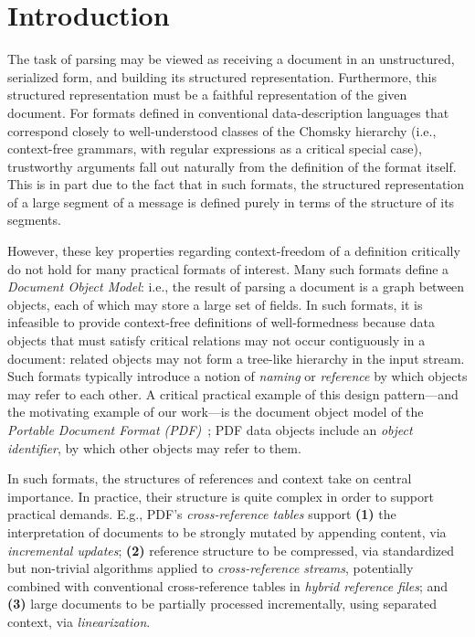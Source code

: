 \section{Introduction}
\label{sec:intro}
The task of parsing may be viewed as receiving a document in an
unstructured, serialized form, and building its structured
representation. Furthermore, this structured representation must be a
faithful representation of the given document.
%
For formats defined in conventional data-description languages that
correspond closely to well-understood classes of the Chomsky hierarchy
(i.e., context-free grammars, with regular expressions as a critical
special case), trustworthy arguments fall out naturally from the
definition of the format itself.
%
This is in part due to the fact that in such formats, the structured
representation of a large segment of a message is defined purely in
terms of the structure of its segments.

However, these key properties regarding context-freedom of a
definition critically do not hold for many practical formats of
interest.
%
Many such formats define a \emph{Document Object Model}: i.e., the
result of parsing a document is a graph between objects, each
of which may store a large set of fields.
%
In such formats, it is infeasible to provide context-free definitions
of well-formedness because data objects that must satisfy critical
relations may not occur contiguously in a document: related objects
may not form a tree-like hierarchy in the input stream.
%
Such formats typically introduce a notion of \emph{naming} or
\emph{reference} by which objects may refer to each other.
%
A critical practical example of this design pattern---and the
motivating example of our work---is the document object model of the
\emph{Portable Document Format (PDF)}~\cite{isotc171sc2wg8ISO32000220202020};
%
PDF data objects include an \emph{object identifier}, by which other
objects may refer to them.

In such formats, the structures of references and context take on
central importance.
%
In practice, their structure is quite complex in order to support
practical demands.
%
E.g., PDF's \emph{cross-reference tables} support
% 
\textbf{(1)} the interpretation of documents to be strongly mutated by
appending content, via \emph{incremental updates};
%
\textbf{(2)} reference structure to be compressed, via standardized
but non-trivial algorithms applied to \emph{cross-reference streams},
potentially combined with conventional cross-reference tables in
\emph{hybrid reference files}; and
% 
\textbf{(3)} large documents to be partially processed incrementally,
using separated context, via \emph{linearization}.

